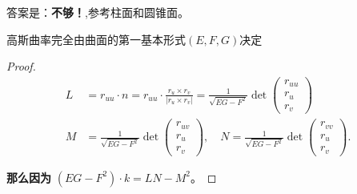 \documentclass[lang=cn,10pt,thmcnt=section]{elegantbook}
\begin{document}
答案是：\textbf{不够！},参考柱面和圆锥面。

\begin{theorem}[高斯绝妙定理]
    高斯曲率完全由曲面的第一基本形式$(E,F,G)$决定
\end{theorem}

\begin{proof}
    \begin{align*}
        L &= r_{uu} \cdot n = r_{uu} \cdot \frac{r_u \times r_v}{|r_u \times r_v|} = \frac{1}{\sqrt{E G - F^2}} \det \begin{pmatrix} r_{uu} \\ r_u \\ r_v \end{pmatrix} \\
        M &= \frac{1}{\sqrt{E G - F^2}} \det \begin{pmatrix} r_{uv} \\ r_u \\ r_v \end{pmatrix}, \quad N = \frac{1}{\sqrt{E G - F^2}} \det \begin{pmatrix} r_{vv} \\ r_u \\ r_v \end{pmatrix}.
        \end{align*}
        
        \textbf{那么因为} $(E G - F^2) \cdot k = L N - M^2$。
        

\end{proof}
\end{document}
